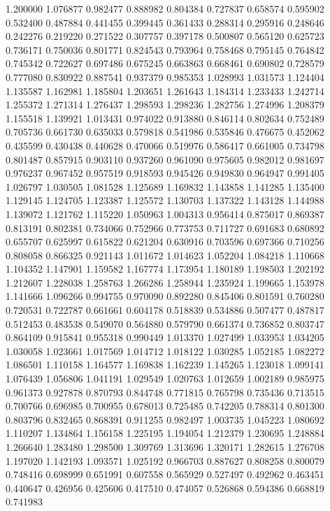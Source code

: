 1.200000
1.076877
0.982477
0.888982
0.804384
0.727837
0.658574
0.595902
0.532400
0.487884
0.441455
0.399445
0.361433
0.288314
0.295916
0.248646
0.242276
0.219220
0.271522
0.307757
0.397178
0.500807
0.565120
0.625723
0.736171
0.750036
0.801771
0.824543
0.793964
0.758468
0.795145
0.764842
0.745342
0.722627
0.697486
0.675245
0.663863
0.668461
0.690802
0.728579
0.777080
0.830922
0.887541
0.937379
0.985353
1.028993
1.031573
1.124404
1.135587
1.162981
1.185804
1.203651
1.261643
1.184314
1.233433
1.242714
1.255372
1.271314
1.276437
1.298593
1.298236
1.282756
1.274996
1.208379
1.155518
1.139921
1.013431
0.974022
0.913880
0.846114
0.802634
0.752489
0.705736
0.661730
0.635033
0.579818
0.541986
0.535846
0.476675
0.452062
0.435599
0.430438
0.440628
0.470066
0.519976
0.586417
0.661005
0.734798
0.801487
0.857915
0.903110
0.937260
0.961090
0.975605
0.982012
0.981697
0.976237
0.967452
0.957519
0.918593
0.945426
0.949830
0.964947
0.991405
1.026797
1.030505
1.081528
1.125689
1.169832
1.143858
1.141285
1.135400
1.129145
1.124705
1.123387
1.125572
1.130703
1.137322
1.143128
1.144988
1.139072
1.121762
1.115220
1.050963
1.004313
0.956414
0.875017
0.869387
0.813191
0.802381
0.734066
0.752966
0.773753
0.711727
0.691683
0.680892
0.655707
0.625997
0.615822
0.621204
0.630916
0.703596
0.697366
0.710256
0.808058
0.866325
0.921143
1.011672
1.014623
1.052204
1.084218
1.110668
1.104352
1.147901
1.159582
1.167774
1.173954
1.180189
1.198503
1.202192
1.212607
1.228038
1.258763
1.266286
1.258944
1.235924
1.199665
1.153978
1.141666
1.096266
0.994755
0.970090
0.892280
0.845406
0.801591
0.760280
0.720531
0.722787
0.661661
0.604178
0.518839
0.534886
0.507477
0.487817
0.512453
0.483538
0.549070
0.564880
0.579790
0.661374
0.736852
0.803747
0.864109
0.915841
0.955318
0.990449
1.013370
1.027499
1.033953
1.034205
1.030058
1.023661
1.017569
1.014712
1.018122
1.030285
1.052185
1.082272
1.086501
1.110158
1.164577
1.169838
1.162239
1.145265
1.123018
1.099141
1.076439
1.056806
1.041191
1.029549
1.020763
1.012659
1.002189
0.985975
0.961373
0.927878
0.870793
0.844748
0.771815
0.765798
0.735436
0.713515
0.700766
0.696985
0.700955
0.678013
0.725485
0.742205
0.788314
0.801300
0.803796
0.832465
0.868391
0.911255
0.982497
1.003735
1.045223
1.080692
1.110207
1.134864
1.156158
1.225195
1.194054
1.212379
1.230695
1.248884
1.266640
1.283480
1.298500
1.309769
1.313696
1.320171
1.282615
1.276708
1.197020
1.142193
1.093571
1.025192
0.966703
0.887627
0.808258
0.800079
0.748416
0.698999
0.651991
0.607558
0.565929
0.527497
0.492962
0.463451
0.440647
0.426956
0.425606
0.417510
0.474057
0.526868
0.594386
0.668819
0.741983

